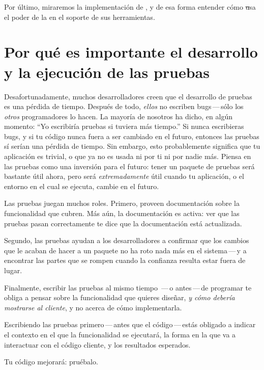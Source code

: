 \documentclass[a4paper,10pt,twoside]{book}
\begin{document}
Por \'ultimo, miraremos la implementaci\'on de \sunit, y de esa forma entender c\'omo \st usa el poder de la  en el soporte de sus herramientas.

\section{Por qu\'e es importante el desarrollo y la ejecuci\'on de las pruebas}

Desafortunadamente, muchos desarrolladores creen que el desarrollo de pruebas es una p\'erdida de tiempo.
Despu\'es de todo, \emph{ellos} no escriben bugs\,---\,s\'olo los \emph{otros} programadores lo hacen.
La mayor\'ia de nosotros ha dicho, en alg\'un momento:
``Yo escribir\'ia pruebas si tuviera m\'as tiempo.''
Si nunca escribieras bugs, y si tu c\'odigo nunca fuera a ser cambiado en el futuro,
entonces las pruebas s\'i ser\'ian una p\'erdida de tiempo.
Sin embargo, esto probablemente significa que tu aplicaci\'on es trivial, o que ya no es usada ni por ti ni por nadie m\'as.  
Piensa en las pruebas como una inversi\'on para el futuro: tener un paquete de pruebas ser\'a bastante \'util ahora,
 pero ser\'a \emph{extremadamente} \'util cuando tu aplicaci\'on, o el entorno en el cual se ejecuta, cambie en el futuro.

Las pruebas juegan muchos roles. Primero, proveen documentaci\'on sobre la funcionalidad que cubren.
M\'as a\'un, la documentaci\'on es activa: ver que las pruebas pasan correctamente te dice que la documentaci\'on est\'a actualizada.

Segundo, las pruebas ayudan a los desarrolladores a confirmar que los cambios que le 
acaban de hacer a un paquete no ha roto nada m\'as en el sistema\,---\,y a encontrar las partes que se rompen cuando la confianza resulta estar fuera de lugar.

Finalmente, escribir las pruebas al mismo tiempo \,---\,o antes\,---\,de programar te obliga a pensar sobre la funcionalidad que quieres dise\~nar, \emph{y c\'omo deber\'ia mostrarse al cliente}, 
y no acerca de c\'omo implementarla.

Escribiendo las pruebas primero\,---\,antes que el c\'odigo\,---\,est\'as obligado a indicar el contexto en el que 
la funcionalidad se ejecutar\'a, la forma en la que va a interactuar con el c\'odigo cliente, y los resultados esperados.  

Tu c\'odigo mejorar\'a: pru\'ebalo.
\end{document}
